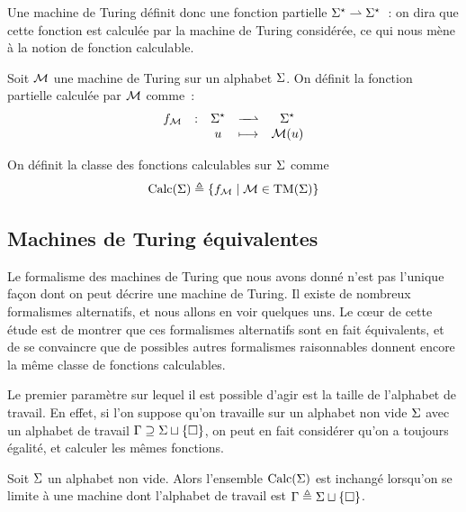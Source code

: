 Une machine de Turing définit donc une fonction partielle
$\Sigma^{\star} \rightharpoonup \Sigma^{\star}$~: on dira que cette fonction est calculée par la
machine de Turing considérée, ce qui nous mène à la notion de fonction
calculable.

\begin{definition}
  Soit $\mathcal{M}$ une machine de Turing sur un alphabet $\Sigma$. On définit la
  fonction partielle calculée par $\mathcal{M}$ comme~:
  \[\makeFunPartial{f_{\varTMM}}{\toStA}{\toStA}{\varwd}{\varTMM(\varwd)}\]
  
  On définit la classe des fonctions calculables sur $\Sigma$ comme
  \[\operatorname{Calc}(\Sigma)\triangleq \left\{ f_{\mathcal{M}} \;\middle\vert\; \mathcal{M} \in \operatorname{TM}(\Sigma) \right\}\]
  \index[notation]{$\Calc(\ABA)$}
\end{definition}

\subsection{Machines de Turing équivalentes}

Le formalisme des machines de Turing que nous avons donné n'est pas l'unique
façon dont on peut décrire une machine de Turing. Il existe de nombreux
formalismes alternatifs, et nous allons en voir quelques uns. Le c\oe ur de
cette étude est de montrer que ces formalismes alternatifs sont en fait
équivalents, et de se convaincre que de possibles autres formalismes
raisonnables donnent encore la même classe de fonctions calculables.

Le premier paramètre sur lequel il est possible d'agir est la taille de
l'alphabet de travail. En effet, si l'on suppose qu'on travaille sur un
alphabet non vide $\Sigma$ avec un alphabet de travail
$\Gamma\supseteq\Sigma\sqcup\{\square\}$, on peut en fait considérer qu'on a toujours
égalité, et calculer les mêmes fonctions.

\begin{theorem}
  Soit $\Sigma$ un alphabet non vide. Alors l'ensemble $\Calc(\ABA)$ est
  inchangé lorsqu'on se limite à une machine dont l'alphabet de travail
  est $\Gamma \triangleq \Sigma \sqcup\{\square\}$.
\end{theorem}

